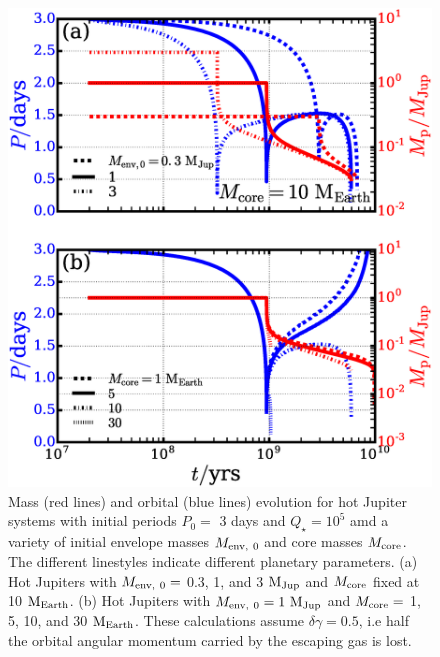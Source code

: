 \documentclass{svjour3}                     %
\begin{document}
\begin{figure}
\includegraphics[width=\textwidth]{plot_mass_orbital_evolution_variable-Mp0-Mcore_qs5_del1-gam0p5}
\caption{Mass (red lines) and orbital (blue lines) evolution for hot Jupiter systems with initial periods $P_{0} =$ 3 days and $Q_\star = 10^5$ amd a variety of initial envelope masses $M_{\rm env,\ 0}$ and core masses $M_{\rm core}$. The different linestyles indicate different planetary parameters. (a) Hot Jupiters with $M_{\rm env,\ 0} =$ 0.3, 1, and 3 ${\rm M_{Jup}}$ and $M_{\rm core}$ fixed at 10 ${\rm M_{Earth}}$. (b) Hot Jupiters with $M_{\rm env,\ 0} = 1\ {\rm M_{Jup}}$ and $M_{\rm core} = $ 1, 5, 10, and 30 ${\rm M_{Earth}}$. These calculations assume $\delta \gamma = 0.5$, i.e half the orbital angular momentum carried by the escaping gas is lost.}
\label{fig:plot_mass_orbital_evolution_variable-Mp0-Mcore_qs5_del1-gam0p5}
\end{figure}
\end{document}
